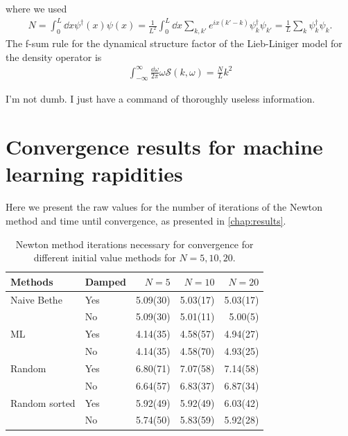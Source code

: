 \documentclass[11pt, a4paper]{report} %
\begin{document}
where we used 
\begin{align}
  \label{eq:6}
  N = \int_0^{L} \dd x \psi^{\dagger}(x) \psi(x)
    = \frac{1}{L^2} \int_{0}^L \dd x \sum_{k,k'} e^{ix(k'-k)} \psi_k^{\dag} \psi_{k'}
    = \frac{1}{L} \sum_k \psi^{\dag}_k \psi_k .
\end{align}
The f-sum rule for the dynamical structure factor of the Lieb-Liniger model for the density operator is
\begin{align}
  \label{eq:16}
  \int_{-\infty}^{\infty} \frac{\dd \omega}{2\pi} \omega \mathcal{S}(k, \omega) = \frac{N}{L}k^2
\end{align}

\begin{savequote}[50mm]
I'm not dumb. I just have a command of thoroughly useless information.
\end{savequote}

\chapter{Convergence results for machine learning rapidities}\label{cha:rawvalues}

Here we present the raw values for the number of iterations of the Newton method and time until convergence, as presented in \cref{chap:results}.


\begin{table}[h]
  \centering
  \begin{tabular}{llrrr}
    Methods & Damped & \(N=5\) & \(N=10\) & \(N=20\) \\\hline 
    Naive Bethe & Yes & 5.09(30) & 5.03(17) & 5.03(17) \\ 
           & No & 5.09(30) & 5.01(11) & 5.00(5) \\\hline
    ML & Yes & 4.14(35) & 4.58(57) & 4.94(27) \\
           & No & 4.14(35) & 4.58(70) & 4.93(25) \\\hline
    Random & Yes & 6.80(71) & 7.07(58) & 7.14(58) \\
           & No & 6.64(57) & 6.83(37) & 6.87(34) \\\hline
    Random sorted  & Yes & 5.92(49) & 5.92(49) & 6.03(42)  \\
           & No & 5.74(50) & 5.83(59) & 5.92(28)
  \end{tabular}
  \caption{Newton method iterations necessary for convergence for different initial value methods for \(N=5,10,20\).}
\end{table}
\end{document}
